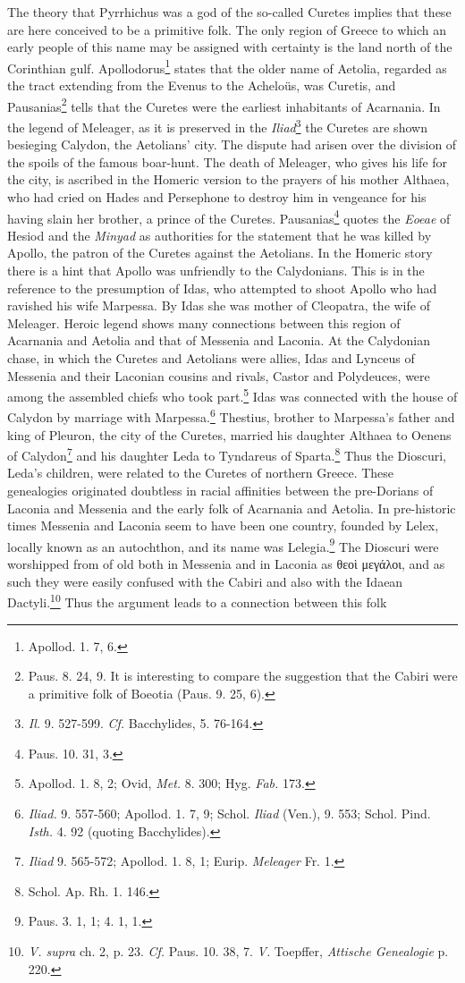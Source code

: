 \documentclass[a4paper, 12pt, oneside]{article}
\begin{document}
The theory that Pyrrhichus was a god of the so-called Curetes implies that these are here conceived to be a primitive folk. The only region of Greece to which an early people of this name may be assigned with certainty is the land north of the Corinthian gulf. Apollodorus\footnote{Apollod. 1. 7, 6.} states that the older name of Aetolia, regarded as the tract extending from the Evenus to the Acheloüs, was Curetis, and Pausanias\footnote{Paus. 8. 24, 9. It is interesting to compare the suggestion that the Cabiri were a primitive folk of Boeotia (Paus. 9. 25, 6).} tells that the Curetes were the earliest inhabitants of Acarnania. In the legend of Meleager, as it is preserved in the \emph{Iliad}\footnote{\emph{Il.} 9. 527-599. \emph{Cf.} Bacchylides, 5. 76-164.} the Curetes are shown besieging Calydon, the Aetolians' city. The dispute had arisen over the division of the spoils of the famous boar-hunt. The death of Meleager, who gives his life for the city, is ascribed in the Homeric version to the prayers of his mother Althaea, who had cried on Hades and Persephone to destroy him in vengeance for his having slain her brother, a prince of the Curetes. Pausanias\footnote{Paus. 10. 31, 3.} quotes the \emph{Eoeae} of Hesiod and the \emph{Minyad} as authorities for the statement that he was killed by Apollo, the patron of the Curetes against the Aetolians. In the Homeric story there is a hint that Apollo was unfriendly to the Calydonians. This is in the reference to the presumption of Idas, who attempted to shoot Apollo who had ravished his wife Marpessa. By Idas she was mother of Cleopatra, the wife of Meleager. Heroic legend shows many connections between this region of Acarnania and Aetolia and that of Messenia and Laconia. At the Calydonian chase, in which the Curetes and Aetolians were allies, Idas and Lynceus of Messenia and their Laconian cousins and rivals, Castor and Polydeuces, were among the assembled chiefs who took part.\footnote{Apollod. 1. 8, 2; Ovid, \emph{Met.} 8. 300; Hyg. \emph{Fab.} 173.} Idas was connected with the house of Calydon by marriage with Marpessa.\footnote{\emph{Iliad.} 9. 557-560; Apollod. 1. 7, 9; Schol. \emph{Iliad} (Ven.), 9. 553; Schol. Pind. \emph{Isth.} 4. 92 (quoting Bacchylides).} Thestius, brother to Marpessa's father and king of Pleuron, the city of the Curetes, married his daughter Althaea to Oenens of Calydon\footnote{\emph{Iliad} 9. 565-572; Apollod. 1. 8, 1; Eurip. \emph{Meleager} Fr. 1.} and his daughter Leda to Tyndareus of Sparta.\footnote{Schol. Ap. Rh. 1. 146.} Thus the Dioscuri, Leda's children, were related to the Curetes of northern Greece. These genealogies originated doubtless in racial affinities between the pre-Dorians of Laconia and Messenia and the early folk of Acarnania and Aetolia. In pre-historic times Messenia and Laconia seem to have been one country, founded by Lelex, locally known as an autochthon, and its name was Lelegia.\footnote{Paus. 3. 1, 1; 4. 1, 1.} The Dioscuri were worshipped from of old both in Messenia and in Laconia as θεοὶ μεγάλοι, and as such they were easily confused with the Cabiri and also with the Idaean Dactyli.\footnote{\emph{V. supra} ch. 2, p. 23. \emph{Cf.} Paus. 10. 38, 7. \emph{V.} Toepffer, \emph{Attische Genealogie} p. 220.} Thus the argument leads to a connection between this folk 
\end{document}
